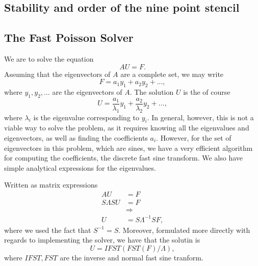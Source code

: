 


\subsection{Stability and order of the nine point stencil}


\subsection{The Fast Poisson Solver}
We are to solve the equation
$$
A U = F.
$$
Assuming that the eigenvectors of $A$ are a complete set, we may write
$$
F = a_1 y_1 + a_2 y_2 + ...,
$$
where $y_1, y_2, \dots$ are the eigenvectors of $A$.
The solution $U$ is the of course
$$
U =
\frac{a_1}{\lambda_1} y_1
+ \frac{a_2}{\lambda_2} y_2
+ \dots,
$$
where $\lambda_i$ is the eigenvalue corresponding to $y_i$.
In general, however, this is not a viable way to solve the problem, as it requires knowing all the eigenvalues and eigenvectors, as well as finding the coefficients $a_i$.
However, for the set of eigenvectors in this problem, which are sines, we have a very efficient algorithm for computing the coefficients, the discrete fast sine transform.
We also have simple analytical expressions for the eigenvalues.

Written as matrix expressions
\begin{align}
  A U &= F\\
  S\Lambda S U &= F\\
  &\Rightarrow\\
  U &= S\Lambda^{-1} S F,
\end{align}
where we used the fact that $S^{-1} = S$.
Moreover, formulated more directly with regards to implementing the solver, we have that the solutin is
$$
U = IFST(FST(F) / \Lambda),
$$
where $IFST, FST$ are the inverse and normal fast sine tranform.

